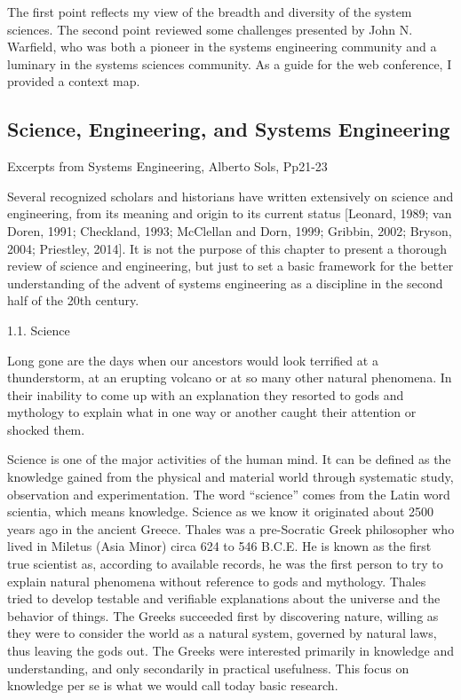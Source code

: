 The first point reflects my view of the breadth and diversity of the system sciences. The second point reviewed some challenges presented by John N. Warfield, who was both a pioneer in the systems engineering community and a luminary in the systems sciences community. As a guide for the web conference, I provided a context map.

\subsection{Science, Engineering, and Systems Engineering}

Excerpts from Systems Engineering, Alberto Sols, Pp21-23

Several recognized scholars and historians have written extensively on science and engineering, from its meaning and origin to its current status [Leonard, 1989; van Doren, 1991; Checkland, 1993; McClellan and Dorn, 1999; Gribbin, 2002; Bryson, 2004; Priestley, 2014]. It is not the purpose of this chapter to present a thorough review of science and engineering, but just to set a basic framework for the better understanding of the advent of systems engineering as a discipline in the second half of the 20th century.

        1.1. Science

Long gone are the days when our ancestors would look terrified at a thunderstorm, at an erupting volcano or at so many other natural phenomena. In their inability to come up with an explanation they resorted to gods and mythology to explain what in one way or another caught their attention or shocked them.

Science is one of the major activities of the human mind. It can be defined as the knowledge gained from the physical and material world through systematic study, observation and experimentation. The word ``science'' comes from the Latin word scientia, which means knowledge. Science as we know it originated about 2500 years ago in the ancient Greece. Thales was a pre-Socratic Greek philosopher who lived in Miletus (Asia Minor) circa 624 to 546 B.C.E. He is known as the first true scientist as, according to available records, he was the first person to try to explain natural phenomena without reference to gods and mythology. Thales tried to develop testable and verifiable explanations about the universe and the behavior of things. The Greeks succeeded first by discovering nature, willing as they were to consider the world as a natural system, governed by natural laws, thus leaving the gods out. The Greeks were interested primarily in knowledge and understanding, and only secondarily in practical usefulness. This focus on knowledge per se is what we would call today basic research.

